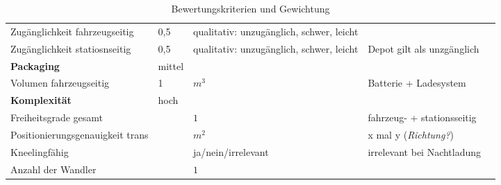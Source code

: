 \documentclass{scrartcl}
\begin{document}
{\begin{landscape}
\begin{table}
\begin{tabularx}{\linewidth}{lllXl}
				Zugänglichkeit fahrzeugseitig    & 0,5        & qualitativ: unzugänglich, schwer, leicht &                                                                   &  \\
				Zugänglichkeit statiosnseitig    & 0,5        & qualitativ: unzugänglich, schwer, leicht & Depot gilt als unzgänglich                                        &  \\ \midrule
				\textbf{Packaging}               & mittel     &                                          &  \\
				Volumen fahrzeugseitig           & 1          & $m^3$                                    & Batterie + Ladesystem                                             &  \\ \midrule
				\textbf{Komplexität}             & hoch       &                                          &  \\
				Freiheitsgrade gesamt            &            & $1$                                      & fahrzeug- + stationsseitig                                        &  \\
				Positionierungsgenauigkeit trans &            & $m^2$                                    & x mal y (\emph{Richtung?})                                        &  \\
				Kneelingfähig                    &            & ja/nein/irrelevant                       & irrelevant bei Nachtladung                                        &  \\
				Anzahl der Wandler               &            & $1$                                      &                                                                   &  \\ \bottomrule
			\end{tabularx}
			\caption{Bewertungskriterien und Gewichtung}
		\end{table} 
	\end{landscape}
	\restoregeometry
	\clearpage%
}



\end{document}
